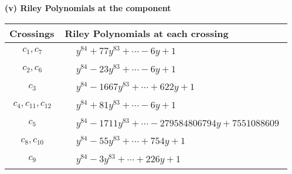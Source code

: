 \documentclass[1p]{elsarticle_modified}
\theoremstyle{definition}
\begin{document}
\flushleft \textbf{(v) Riley Polynomials at the component}\newline \\
\begin{tabular}{m{50pt}|m{274pt}}
Crossings & \hspace{64pt}Riley Polynomials at each crossing \\
\hline $$\begin{aligned}c_{1},c_{7}\end{aligned}$$&$\begin{aligned}
&y^{84}+77 y^{83}+\cdots-6 y+1
\end{aligned}$\\
\hline $$\begin{aligned}c_{2},c_{6}\end{aligned}$$&$\begin{aligned}
&y^{84}-23 y^{83}+\cdots-6 y+1
\end{aligned}$\\
\hline $$\begin{aligned}c_{3}\end{aligned}$$&$\begin{aligned}
&y^{84}-1667 y^{83}+\cdots+622 y+1
\end{aligned}$\\
\hline $$\begin{aligned}c_{4},c_{11},c_{12}\end{aligned}$$&$\begin{aligned}
&y^{84}+81 y^{83}+\cdots-6 y+1
\end{aligned}$\\
\hline $$\begin{aligned}c_{5}\end{aligned}$$&$\begin{aligned}
&y^{84}-1711 y^{83}+\cdots-279584806794 y+7551088609
\end{aligned}$\\
\hline $$\begin{aligned}c_{8},c_{10}\end{aligned}$$&$\begin{aligned}
&y^{84}-55 y^{83}+\cdots+754 y+1
\end{aligned}$\\
\hline $$\begin{aligned}c_{9}\end{aligned}$$&$\begin{aligned}
&y^{84}-3 y^{83}+\cdots+226 y+1
\end{aligned}$\\
\hline
\end{tabular}\\~\\
\end{document}
